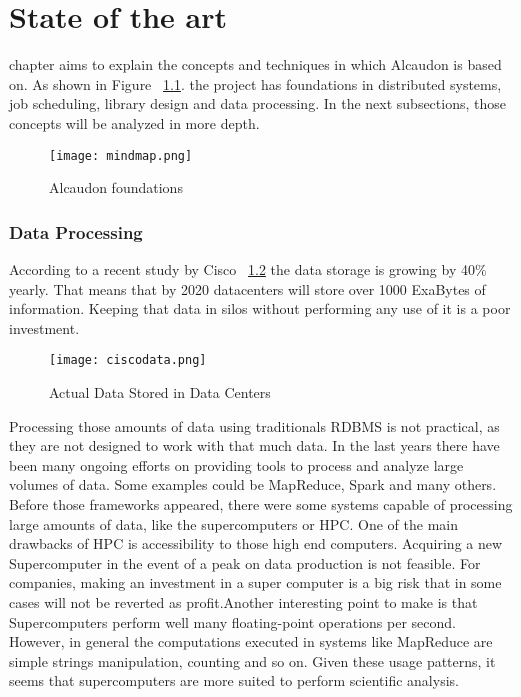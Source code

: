 \chapter{State of the art}
\label{chap:stateoftheart}

 chapter aims to explain the concepts and techniques in which
Alcaudon is based on. As shown in Figure ~\ref{fig:mindmap}. the project has foundations in
distributed systems, job scheduling, library design and data processing. In the
next subsections, those concepts will be analyzed in more depth.

\begin{figure}[!h]
\begin{center}
\texttt{[image: mindmap.png]}
\caption{Alcaudon foundations}
\label{fig:mindmap}
\end{center}
\end{figure}

\subsection{Data Processing}

According to a recent study by Cisco \cite{ciscosurvey}~\ref{fig:ciscodata} the
data storage is growing by 40\% yearly. That means that by 2020 datacenters will
store over 1000 ExaBytes of information. Keeping that data in silos without
performing any use of it is a poor investment.

\begin{figure}[!h]
\begin{center}
\texttt{[image: ciscodata.png]}
\caption{Actual Data Stored in Data Centers\cite{ciscosurvey}}
\label{fig:ciscodata}
\end{center}
\end{figure}

Processing those amounts of data using traditionals RDBMS is not practical, as they
are not designed to work with that much data. In the last years there have been
many ongoing efforts on providing tools to process and analyze large volumes of
data. Some examples could be MapReduce\cite{mapreduce}, Spark\cite{spark} and
many others. Before those frameworks appeared, there were some systems capable
of processing large amounts of data, like the supercomputers or HPC. One of the
main drawbacks of HPC is accessibility to those high end computers. Acquiring a
new Supercomputer in the event of a peak on data production is not feasible. For
companies, making an investment in a super computer is a big risk that in some
cases will not be reverted as profit.Another interesting point to make is that
Supercomputers perform well many floating-point operations per second. However,
in general the computations executed in systems like MapReduce are simple
strings manipulation, counting and so on. Given these usage patterns, it seems
that supercomputers are more suited to perform scientific analysis.

